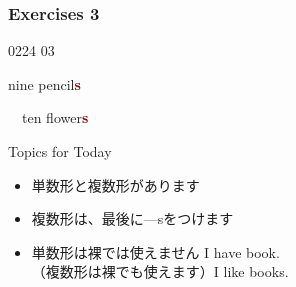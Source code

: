 \documentclass[aspectratio=169,xcolor={dvipsnames,table}]{beamer}
\newcommand{\myaudio}[1]{\href{#1}{\faVolumeUp}}
\begin{document}
\begin{frame}[plain]\frametitle{Exercises 3}
  \hfill{\tiny 0224}\,{\scriptsize \myaudio{./audio/005_singular_plural_03.mp3}}\,{\tiny 03}

  \hspace{20pt}%
  \pause
  \hspace{15pt}
  \pause

  \mbox{}\hfill{\large nine pencil\textcolor{Maroon}{\bfseries s}}
  \pause

  \bigskip

  \bigskip


  \bcfleur\,\,\,\,\hspace{45pt}%
  \pause
  \bcfleur\bcfleur\bcfleur\bcfleur\bcfleur\hspace{15pt}
  \bcfleur\bcfleur\bcfleur\bcfleur\bcfleur\hspace{10pt}
  \pause
  \hfill{\large ten flower\textcolor{Maroon}{\bfseries s}}


  \pause
  \begin{block}{Topics for Today}\small
    \begin{itemize}[square]
      \item 単数形と複数形があります
      \item 複数形は、最後に---sをつけます
      \item 単数形は裸では使えません\,\,\dbend\hfill{\scriptsize *I have book.}\\
            （複数形は裸でも使えます）\hfill{\scriptsize I like books.}
    \end{itemize}
  \end{block}
\end{frame}
\end{document}
